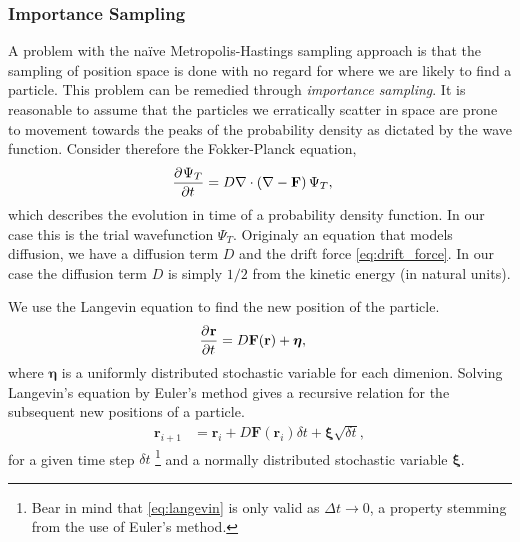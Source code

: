 \documentclass[
    a4paper, aps, twocolumn, floatfix, superscriptaddress, nofootinbib]{revtex4-1}
\newcommand{\vf}{\mathbf}
\newcommand{\vfg}{\boldsymbol}
\newcommand{\1}{\mathds{1}}
\begin{document}
        \subsubsection{Importance Sampling}
            A problem with the naïve Metropolis-Hastings sampling approach is
            that the sampling of position space is done with no regard for where
            we are likely to find a particle. This problem can be remedied
            through \emph{importance sampling}.  It is reasonable to assume that
            the particles we erratically scatter in space are prone to movement
            towards the peaks of the probability density as dictated by the wave
            function. Consider therefore the Fokker-Planck equation,
            \begin{align}
                \dpd[]{\Psi_T}{t}
                &=
                D \nabla\cdot
                \left(
                    \nabla
                    - \vf{F}
                \right) \Psi_T,
                \label{eq:fokker_planck}
            \end{align}
            which describes the evolution in time of a probability density
            function. In our case this is the trial wavefunction $\Psi_T$.
            Originaly an equation that models diffusion, we have a diffusion
            term $D$ and the drift force \autoref{eq:drift_force}. In our case
            the diffusion term $D$ is simply $1/2$ from the kinetic energy (in
            natural units).

            We use the Langevin equation to find the new position of the
            particle.
            \begin{align}
                \dpd[]{\vf{r}}{t}
                &=
                D\vf{F}(\vf{r}) + \vfg{\eta},
                \label{eq:langevin}
            \end{align}
            where $\vfg{\eta}$ is a uniformly distributed stochastic variable
            for each dimenion.  Solving Langevin's equation by Euler's method
            gives a recursive relation for the subsequent new positions of a
            particle.
            \begin{align}
                \vf{r}_{i + 1}
                &=
                \vf{r}_i + D\vf{F}(\vf{r}_i)\delta t
                + \vfg{\xi}\sqrt{\delta t},
            \end{align}
            for a given time step $\delta t$
            \footnote{
                Bear in mind that \autoref{eq:langevin} is only valid as $\Delta
                t \to 0$, a property stemming from the use of Euler's method.
            }
            and a normally distributed stochastic variable $\vfg{\xi}$.
\end{document}
